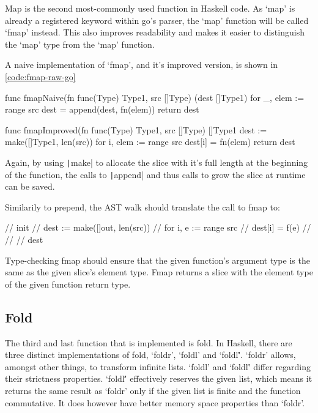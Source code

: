 Map is the second most-commonly used function in Haskell code. As `map' is already a registered keyword
within go's parser, the `map' function will be called `fmap' instead. This also improves readability
and makes it easier to distinguish the `map' type from the `map' function.

A naive implementation of `fmap', and it's improved version, is shown
in \ref{code:fmap-raw-go}

\begin{code}
    \label{code:fmap-raw-go}
    \begin{gocode}
func fmapNaive(fn func(Type) Type1, src []Type) (dest []Type1) {
    for _, elem := range src {
        dest = append(dest, fn(elem))
    }
    return dest
}

func fmapImproved(fn func(Type) Type1, src []Type) []Type1 {
    dest := make([]Type1, len(src))
    for i, elem := range src {
        dest[i] = fn(elem)
    }
    return dest
}
    \end{gocode}
\end{code}

Again, by using \texttt|make| to allocate the slice with it's full length at the beginning
of the function, the calls to \texttt|append| and thus calls to grow the
slice at runtime can be saved.

Similarily to prepend, the AST walk should translate the call to fmap to:
\begin{code}
    \begin{gocode}
//   init {
//     dest := make([]out, len(src))
//     for i, e := range src {
//       dest[i] = f(e)
//     }
//   }
//   dest
    \end{gocode}
\end{code}

Type-checking fmap should ensure that the given function's argument type is the same
as the given slice's element type. Fmap returns a slice with the element type of
the given function return type.

\subsection{Fold}

The third and last function that is implemented is fold.
In Haskell, there are three distinct implementations of fold, `foldr', `foldl' and `foldl\''.
`foldr' allows, amongst other things, to transform infinite lists. `foldl' and `foldl\''
differ regarding their strictness properties. `foldl\'' effectively reserves the given list,
which means it returns the same result as `foldr' only if the given list is finite and the
function commutative. It does however have better memory space properties than `foldr'.

